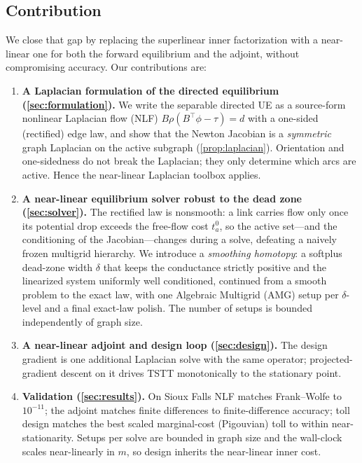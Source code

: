 \documentclass[ijoc]{informs3}
\begin{document}
\subsection{Contribution}
We close that gap by replacing the superlinear inner factorization with a near-linear one for both the forward
equilibrium and the adjoint, without compromising accuracy. Our contributions are:
\begin{enumerate}[leftmargin=*]
\item \textbf{A Laplacian formulation of the directed equilibrium (\cref{sec:formulation}).} We write the
separable directed UE as a source-form nonlinear Laplacian flow (NLF) $B\rho(B^\top\phi-\tau)=d$ with a one-sided
(rectified) edge law, and show that the Newton Jacobian is a \emph{symmetric} graph Laplacian on the
active subgraph (\cref{prop:laplacian}). Orientation and one-sidedness do not break the Laplacian; they only
determine which arcs are active. Hence the near-linear Laplacian toolbox applies.
\item \textbf{A near-linear equilibrium solver robust to the dead zone (\cref{sec:solver}).} The rectified law
is nonsmooth: a link carries flow only once its potential drop exceeds the free-flow cost $t^0_a$, so the active
set---and the conditioning of the Jacobian---changes during a solve, defeating a naively frozen multigrid
hierarchy. We introduce a \emph{smoothing homotopy}: a softplus dead-zone width $\delta$ that keeps the
conductance strictly positive and the linearized system uniformly well conditioned, continued from a smooth
problem to the exact law, with one Algebraic Multigrid (AMG) setup per $\delta$-level and a final exact-law
polish. The number of setups is bounded independently of graph size.
\item \textbf{A near-linear adjoint and design loop (\cref{sec:design}).} The design gradient is one additional
Laplacian solve with the same operator; projected-gradient descent on it drives TSTT monotonically to the
stationary point.
\item \textbf{Validation (\cref{sec:results}).} On Sioux Falls NLF matches Frank--Wolfe to $10^{-11}$;
the adjoint matches finite differences to finite-difference accuracy; toll design matches the best
scaled marginal-cost (Pigouvian) toll to within near-stationarity. Setups per solve are bounded in graph size and the wall-clock scales near-linearly in
$m$, so design inherits the near-linear inner cost.
\end{enumerate}
\end{document}
